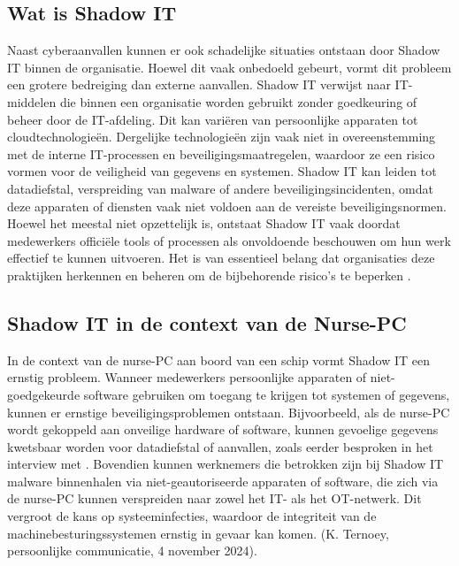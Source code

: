 \subsection{Wat is Shadow IT}
Naast cyberaanvallen kunnen er ook schadelijke situaties ontstaan door Shadow IT binnen de organisatie. Hoewel dit vaak onbedoeld gebeurt, vormt dit probleem een 
grotere bedreiging dan externe aanvallen. Shadow IT verwijst naar IT-middelen die binnen een organisatie worden gebruikt zonder goedkeuring of beheer door de IT-afdeling. 
Dit kan variëren van persoonlijke apparaten tot cloudtechnologieën. Dergelijke technologieën zijn vaak niet in overeenstemming met de interne IT-processen en beveiligingsmaatregelen, waardoor ze een 
risico vormen voor de veiligheid van gegevens en systemen. Shadow IT kan leiden tot datadiefstal, 
verspreiding van malware of andere beveiligingsincidenten, omdat deze apparaten of diensten vaak niet voldoen aan de vereiste beveiligingsnormen. Hoewel het meestal niet opzettelijk is, 
ontstaat Shadow IT vaak doordat medewerkers officiële tools of processen als onvoldoende beschouwen om hun werk effectief te kunnen uitvoeren. Het is van essentieel belang dat organisaties 
deze praktijken herkennen en beheren om de bijbehorende risico’s te beperken \autocite{NCSC2023}.

\subsection{Shadow IT in de context van de Nurse-PC}
In de context van de nurse-PC aan boord van een schip vormt Shadow IT een ernstig probleem. Wanneer medewerkers persoonlijke apparaten of 
niet-goedgekeurde software gebruiken om toegang te krijgen tot systemen of gegevens, kunnen er ernstige beveiligingsproblemen ontstaan. 
Bijvoorbeeld, als de nurse-PC wordt gekoppeld aan onveilige hardware of software, kunnen gevoelige gegevens kwetsbaar worden voor datadiefstal of aanvallen, zoals eerder besproken in het interview met \textcite{Hecker2021}. 
Bovendien kunnen werknemers die betrokken zijn bij Shadow IT malware binnenhalen via niet-geautoriseerde apparaten of software, die zich via de nurse-PC kunnen verspreiden naar zowel 
het IT- als het OT-netwerk. Dit vergroot de kans op systeeminfecties, waardoor de integriteit van de machinebesturingssystemen ernstig in gevaar kan komen. (K. Ternoey, persoonlijke communicatie, 4 november 2024).

